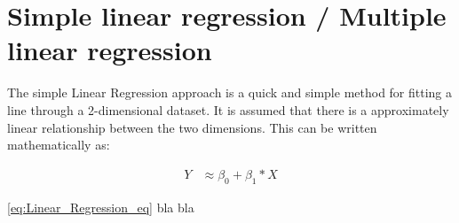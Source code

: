 \graphicspath{{Chapters/Indledning/}}

\chapter{Simple linear regression / Multiple linear regression}

The simple Linear Regression approach is a quick and simple method for fitting a line through a 2-dimensional dataset. It is assumed that there is a approximately linear relationship between the two dimensions. This can be written mathematically as:

\begin{equation} \label{eq:Linear_Regression_eq}
	\begin{split}
		Y & \approx \beta_0 + \beta_1 * X
	\end{split}
\end{equation} 

\cref{eq:Linear_Regression_eq} bla bla